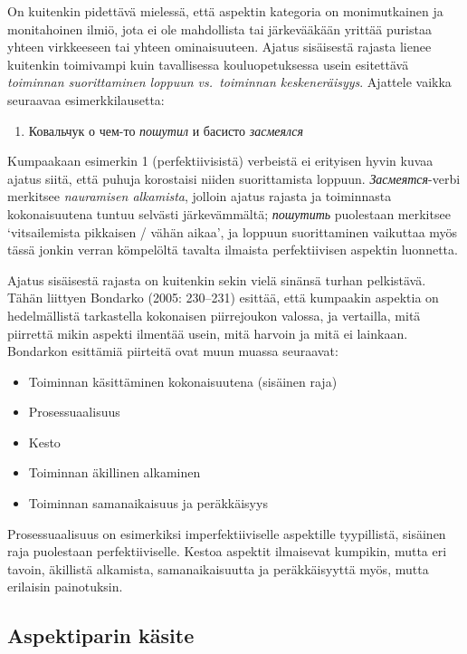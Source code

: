 \documentclass[]{scrartcl}
\providecommand{\tightlist}{%
  \setlength{\itemsep}{0pt}\setlength{\parskip}{0pt}}
\begin{document}
On kuitenkin pidettävä mielessä, että aspektin kategoria on
monimutkainen ja monitahoinen ilmiö, jota ei ole mahdollista tai
järkevääkään yrittää puristaa yhteen virkkeeseen tai yhteen
ominaisuuteen. Ajatus sisäisestä rajasta lienee kuitenkin toimivampi
kuin tavallisessa kouluopetuksessa usein esitettävä \emph{toiminnan
suorittaminen loppuun vs.~toiminnan keskeneräisyys}. Ajattele vaikka
seuraavaa esimerkkilausetta:

\begin{enumerate}
\def\labelenumi{(\arabic{enumi})}
\tightlist
\item
  Ковальчук о чем-то \emph{пошутил} и басисто \emph{засмеялся}
\end{enumerate}

Kumpaakaan esimerkin 1 (perfektiivisistä) verbeistä ei erityisen hyvin
kuvaa ajatus siitä, että puhuja korostaisi niiden suorittamista loppuun.
\emph{Засмеятся}-verbi merkitsee \emph{nauramisen alkamista}, jolloin
ajatus rajasta ja toiminnasta kokonaisuutena tuntuu selvästi
järkevämmältä; \emph{пошутить} puolestaan merkitsee `vitsailemista
pikkaisen / vähän aikaa', ja loppuun suorittaminen vaikuttaa myös tässä
jonkin verran kömpelöltä tavalta ilmaista perfektiivisen aspektin
luonnetta.

Ajatus sisäisestä rajasta on kuitenkin sekin vielä sinänsä turhan
pelkistävä. Tähän liittyen Bondarko (2005: 230--231) esittää, että
kumpaakin aspektia on hedelmällistä tarkastella kokonaisen piirrejoukon
valossa, ja vertailla, mitä piirrettä mikin aspekti ilmentää usein, mitä
harvoin ja mitä ei lainkaan. Bondarkon esittämiä piirteitä ovat muun
muassa seuraavat:

\begin{itemize}
\tightlist
\item
  Toiminnan käsittäminen kokonaisuutena (sisäinen raja)
\item
  Prosessuaalisuus
\item
  Kesto
\item
  Toiminnan äkillinen alkaminen
\item
  Toiminnan samanaikaisuus ja peräkkäisyys
\end{itemize}

Prosessuaalisuus on esimerkiksi imperfektiiviselle aspektille
tyypillistä, sisäinen raja puolestaan perfektiiviselle. Kestoa aspektit
ilmaisevat kumpikin, mutta eri tavoin, äkillistä alkamista,
samanaikaisuutta ja peräkkäisyyttä myös, mutta erilaisin painotuksin.

\subsection{Aspektiparin käsite}\label{aspektiparin-kuxe4site}
\end{document}
